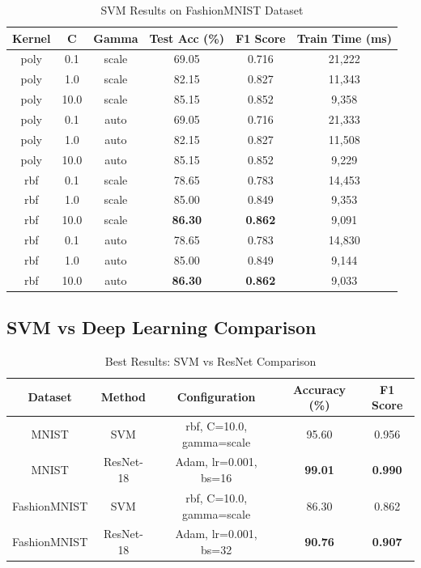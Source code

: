 \documentclass[11pt,a4paper]{article}
\begin{document}
\begin{table}[H]
\centering
\caption{SVM Results on FashionMNIST Dataset}
\begin{tabular}{|c|c|c|c|c|c|}
\hline
\textbf{Kernel} & \textbf{C} & \textbf{Gamma} & \textbf{Test Acc (\%)} & \textbf{F1 Score} & \textbf{Train Time (ms)} \\
\hline
poly & 0.1 & scale & 69.05 & 0.716 & 21,222 \\
\hline
poly & 1.0 & scale & 82.15 & 0.827 & 11,343 \\
\hline
poly & 10.0 & scale & 85.15 & 0.852 & 9,358 \\
\hline
poly & 0.1 & auto & 69.05 & 0.716 & 21,333 \\
\hline
poly & 1.0 & auto & 82.15 & 0.827 & 11,508 \\
\hline
poly & 10.0 & auto & 85.15 & 0.852 & 9,229 \\
\hline
rbf & 0.1 & scale & 78.65 & 0.783 & 14,453 \\
\hline
rbf & 1.0 & scale & 85.00 & 0.849 & 9,353 \\
\hline
rbf & 10.0 & scale & \textbf{86.30} & \textbf{0.862} & 9,091 \\
\hline
rbf & 0.1 & auto & 78.65 & 0.783 & 14,830 \\
\hline
rbf & 1.0 & auto & 85.00 & 0.849 & 9,144 \\
\hline
rbf & 10.0 & auto & \textbf{86.30} & \textbf{0.862} & 9,033 \\
\hline
\end{tabular}
\end{table}

\subsection{SVM vs Deep Learning Comparison}

\begin{table}[H]
\centering
\caption{Best Results: SVM vs ResNet Comparison}
\begin{tabular}{|c|c|c|c|c|}
\hline
\textbf{Dataset} & \textbf{Method} & \textbf{Configuration} & \textbf{Accuracy (\%)} & \textbf{F1 Score} \\
\hline
MNIST & SVM & rbf, C=10.0, gamma=scale & 95.60 & 0.956 \\
\hline
MNIST & ResNet-18 & Adam, lr=0.001, bs=16 & \textbf{99.01} & \textbf{0.990} \\
\hline
FashionMNIST & SVM & rbf, C=10.0, gamma=scale & 86.30 & 0.862 \\
\hline
FashionMNIST & ResNet-18 & Adam, lr=0.001, bs=32 & \textbf{90.76} & \textbf{0.907} \\
\hline
\end{tabular}
\end{table}
\end{document}
